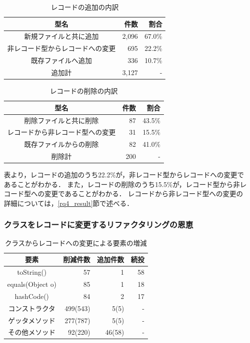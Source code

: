 \begin{table}[t]
    \caption{レコードの追加の内訳}
    \label{record_addition}
    \centering
    \begin{tabular}{c||r|r}
        \hline
        型名 & 件数 & 割合\\
        \hline\hline
        新規ファイルと共に追加 & 2,096 & 67.0\%\\
        非レコード型からレコードへの変更 & 695 & 22.2\%\\
        既存ファイルへ追加 & 336 & 10.7\%\\
        \hline
        追加計 & 3,127 & -\\
        \hline
    \end{tabular}
\end{table}

\begin{table}[t]
    \caption{レコードの削除の内訳}
    \label{record_deletion}
    \centering
    \begin{tabular}{c||r|r}
        \hline
        型名 & 件数 & 割合\\
        \hline\hline
        削除ファイルと共に削除 & 87 & 43.5\%\\
        レコードから非レコード型への変更 & 31 & 15.5\%\\
        既存ファイルからの削除 & 82 & 41.0\%\\
        \hline
        削除計 & 200 &-\\
        \hline
    \end{tabular}
\end{table}

表より，レコードの追加のうち22.2\%が，非レコード型からレコードへの変更であることがわかる．
また，レコードの削除のうち15.5\%が，レコード型から非レコード型への変更であることがわかる．
レコードから非レコード型への変更の詳細については，\ref{rq4_result}節で述べる．

\subsubsection{クラスをレコードに変更するリファクタリングの恩恵}

\begin{table}[t]
  \caption{クラスからレコードへの変更による要素の増減}
  \label{refactoring_content}
  \centering
  \begin{tabular}{c||r|r|r}
      \hline
      要素 & 削減件数 & 追加件数 & 続投\\
      \hline\hline
      toString() & 57 & 1 & 58\\
      equals(Object o) & 85 & 1 & 18\\
      hashCode() & 84 & 2 & 17\\
      コンストラクタ & 499(543) & 5(5) & -\\
      ゲッタメソッド & 277(787) & 5(5) & -\\
      その他メソッド & 92(220) & 46(58) & -\\
      \hline
  \end{tabular}
\end{table}

